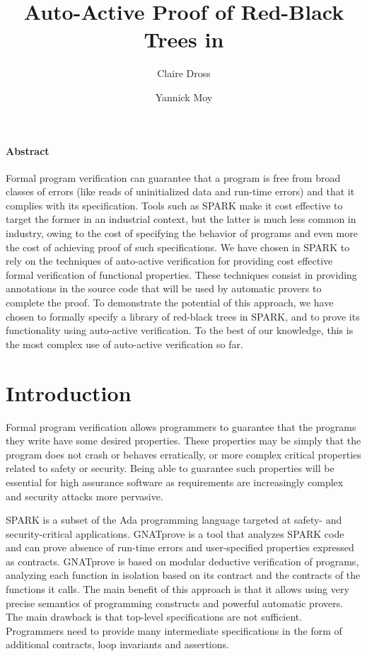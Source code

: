 \documentclass{llncs}
\title{Auto-Active Proof of Red-Black Trees in \spark}
\author{Claire Dross \and Yannick Moy}
\institute{AdaCore, F-75009 Paris}
\date{}
\newcommand{\spark}{SPARK\xspace}
\begin{document}
\sloppy
{}
\maketitle

\paragraph{Abstract}
Formal program verification can guarantee that a program is free from broad
classes of errors (like reads of uninitialized data and run-time errors) and
that it complies with its specification. Tools such as \spark make it cost
effective to target the former in an industrial context, but the latter is much
less common in industry, owing to the cost of specifying the behavior of
programs and even more the cost of achieving proof of such specifications. We
have chosen in \spark to rely on the techniques of auto-active verification for
providing cost effective formal verification of functional properties. These
techniques consist in providing annotations in the source code that will be
used by automatic provers to complete the proof. To demonstrate
the potential of this approach, we have chosen to formally specify a library
of red-black trees in \spark, and to prove its functionality using auto-active
verification. To the best of our knowledge, this is the most complex use of
auto-active verification so far.


\section{Introduction}

Formal program verification allows programmers to guarantee that the programs
they write have some desired properties. These properties may be simply that
the program does not crash or behaves erratically, or more complex critical
properties related to safety or security. Being able to guarantee such
properties will be essential for high assurance software as requirements are
increasingly complex and security attacks more pervasive.

SPARK is a subset of the Ada programming language targeted at safety- and
security-critical applications. GNATprove is a tool that analyzes SPARK code
and can prove absence of run-time errors and user-specified properties
expressed as contracts. GNATprove is based on modular deductive verification of
programs, analyzing each function in isolation based on its contract and the
contracts of the functions it calls. The main benefit of this approach is that
it allows using very precise semantics of programming constructs and powerful
automatic provers. The main drawback is that top-level specifications are not
sufficient. Programmers need to provide many intermediate specifications in the
form of additional contracts, loop invariants and assertions.
\end{document}
